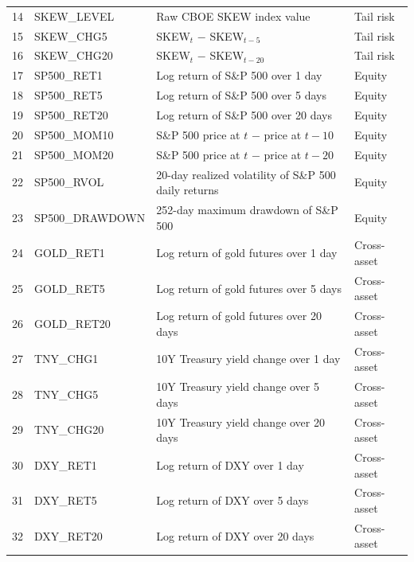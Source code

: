 \documentclass[12pt]{article}
\begin{document}
\begin{table}[H]
\begin{tabular}{llll}
\midrule
14 & SKEW\_LEVEL       & Raw CBOE SKEW index value                                  & Tail risk \\
15 & SKEW\_CHG5        & SKEW$_t$ $-$ SKEW$_{t-5}$                                  & Tail risk \\
16 & SKEW\_CHG20       & SKEW$_t$ $-$ SKEW$_{t-20}$                                 & Tail risk \\
\midrule
17 & SP500\_RET1       & Log return of S\&P 500 over 1 day                          & Equity \\
18 & SP500\_RET5       & Log return of S\&P 500 over 5 days                         & Equity \\
19 & SP500\_RET20      & Log return of S\&P 500 over 20 days                        & Equity \\
20 & SP500\_MOM10      & S\&P 500 price at $t$ $-$ price at $t-10$                  & Equity \\
21 & SP500\_MOM20      & S\&P 500 price at $t$ $-$ price at $t-20$                  & Equity \\
22 & SP500\_RVOL       & 20-day realized volatility of S\&P 500 daily returns        & Equity \\
23 & SP500\_DRAWDOWN   & 252-day maximum drawdown of S\&P 500                       & Equity \\
\midrule
24 & GOLD\_RET1        & Log return of gold futures over 1 day                      & Cross-asset \\
25 & GOLD\_RET5        & Log return of gold futures over 5 days                     & Cross-asset \\
26 & GOLD\_RET20       & Log return of gold futures over 20 days                    & Cross-asset \\
27 & TNY\_CHG1         & 10Y Treasury yield change over 1 day                       & Cross-asset \\
28 & TNY\_CHG5         & 10Y Treasury yield change over 5 days                      & Cross-asset \\
29 & TNY\_CHG20        & 10Y Treasury yield change over 20 days                     & Cross-asset \\
30 & DXY\_RET1         & Log return of DXY over 1 day                               & Cross-asset \\
31 & DXY\_RET5         & Log return of DXY over 5 days                              & Cross-asset \\
32 & DXY\_RET20        & Log return of DXY over 20 days                             & Cross-asset \\

\end{tabular}
\end{table}
\end{document}
